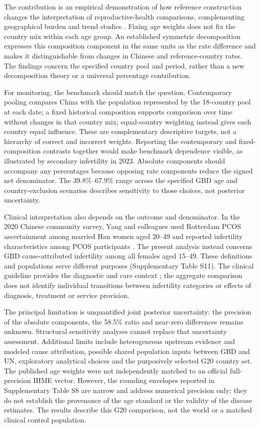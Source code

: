 \documentclass[11pt,a4paper]{article}
\begin{document}
The contribution is an empirical demonstration of how reference construction changes the interpretation of reproductive-health comparisons, complementing geographical burden and trend studies \citep{liu_pcos2024,liang_burden2025,liang_trend2026}. Fixing age weights does not fix the country mix within each age group. An established symmetric decomposition expresses this composition component in the same units as the rate difference and makes it distinguishable from changes in Chinese and reference-country rates. The findings concern the specified country pool and period, rather than a new decomposition theory or a universal percentage contribution.

For monitoring, the benchmark should match the question. Contemporary pooling compares China with the population represented by the 18-country pool at each date; a fixed historical composition supports comparison over time without changes in that country mix; equal-country weighting instead gives each country equal influence. These are complementary descriptive targets, not a hierarchy of correct and incorrect weights. Reporting the contemporary and fixed-composition contrasts together would make benchmark dependence visible, as illustrated by secondary infertility in 2023. Absolute components should accompany any percentages because opposing rate components reduce the signed net denominator. The 39.8\%--67.9\% range across the specified GBD age and country-exclusion scenarios describes sensitivity to those choices, not posterior uncertainty.

{\color{blue} Clinical interpretation also depends on the outcome and denominator. In the 2020 Chinese community survey, Yang and colleagues used Rotterdam PCOS ascertainment among married Han women aged 20--49 and reported infertility characteristics among PCOS participants \citep{yang}. The present analysis instead concerns GBD cause-attributed infertility among all females aged 15--49. These definitions and populations serve different purposes (Supplementary Table S11). The clinical guideline provides the diagnostic and care context \citep{pcos}; the aggregate comparison does not identify individual transitions between infertility categories or effects of diagnosis, treatment or service provision.}

{\color{blue} The principal limitation is unquantified joint posterior uncertainty: the precision of the absolute components, the 58.5\% ratio and near-zero differences remains unknown. Structural sensitivity analyses cannot replace that uncertainty assessment. Additional limits include heterogeneous upstream evidence and modeled cause attribution, possible shared population inputs between GBD and UN, exploratory analytical choices and the purposively selected G20 country set. The published age weights were not independently matched to an official full-precision IHME vector. However, the rounding envelopes reported in Supplementary Table S8 are narrow and address numerical precision only; they do not establish the provenance of the age standard or the validity of the disease estimates. The results describe this G20 comparison, not the world or a matched clinical control population.}
\end{document}
